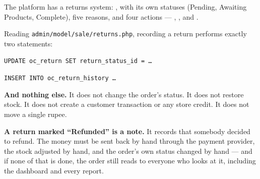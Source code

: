 \begin{alertbox}
The platform has a returns system: , with its own
statuses (Pending, Awaiting Products, Complete), five reasons, and four
actions --- , ,
 and .

\smallskip
Reading \texttt{admin/model/sale/returns.php}, recording a return performs
exactly two statements:

\begin{tight}
  \item \texttt{UPDATE oc\_return SET return\_status\_id = \dots}
  \item \texttt{INSERT INTO oc\_return\_history \dots}
\end{tight}

\smallskip
\textbf{And nothing else.} It does not change the order's status. It does not
restore stock. It does not create a customer transaction or any store credit.
It does not move a single rupee.

\smallskip
\textbf{A return marked ``Refunded'' is a note.} It records that somebody
decided to refund. The money must be sent back by hand through the payment
provider, the stock adjusted by hand, and the order's own status changed by
hand --- and if none of that is done, the order still reads  to
everyone who looks at it, including the dashboard and every report.
\end{alertbox}

